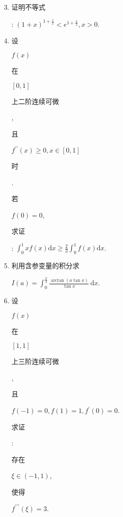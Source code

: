 \documentclass[10pt]{article}
\begin{document}
\begin{enumerate}
  \setcounter{enumi}{2}
  \item \begin{CJK}{UTF8}{mj}证明不等式\end{CJK}: $(1+x)^{1+\frac{1}{x}}<e^{1+\frac{x}{2}}, x>0$.

  \item \begin{CJK}{UTF8}{mj}设\end{CJK} $f(x)$ \begin{CJK}{UTF8}{mj}在\end{CJK} $[0,1]$ \begin{CJK}{UTF8}{mj}上二阶连续可微\end{CJK}, \begin{CJK}{UTF8}{mj}且\end{CJK} $f^{\prime \prime}(x) \geqslant 0, x \in[0,1]$ \begin{CJK}{UTF8}{mj}时\end{CJK}. \begin{CJK}{UTF8}{mj}若\end{CJK} $f(0)=0$, \begin{CJK}{UTF8}{mj}求证\end{CJK}: $\int_{0}^{1} x f(x) \mathrm{d} x \geqslant \frac{2}{3} \int_{0}^{1} f(x) \mathrm{d} x$.

  \item \begin{CJK}{UTF8}{mj}利用含参变量的积分求\end{CJK} $I(a)=\int_{0}^{\frac{\pi}{2}} \frac{\arctan (a \tan x)}{\tan x} \mathrm{~d} x$.

  \item \begin{CJK}{UTF8}{mj}设\end{CJK} $f(x)$ \begin{CJK}{UTF8}{mj}在\end{CJK} $[1,1]$ \begin{CJK}{UTF8}{mj}上三阶连续可微\end{CJK}, \begin{CJK}{UTF8}{mj}且\end{CJK} $f(-1)=0, f(1)=1, f^{\prime}(0)=0$. \begin{CJK}{UTF8}{mj}求证\end{CJK}: \begin{CJK}{UTF8}{mj}存在\end{CJK} $\xi \in(-1,1)$, \begin{CJK}{UTF8}{mj}使得\end{CJK} $f^{\prime \prime \prime}(\xi)=3$.


\end{enumerate}
\end{document}
